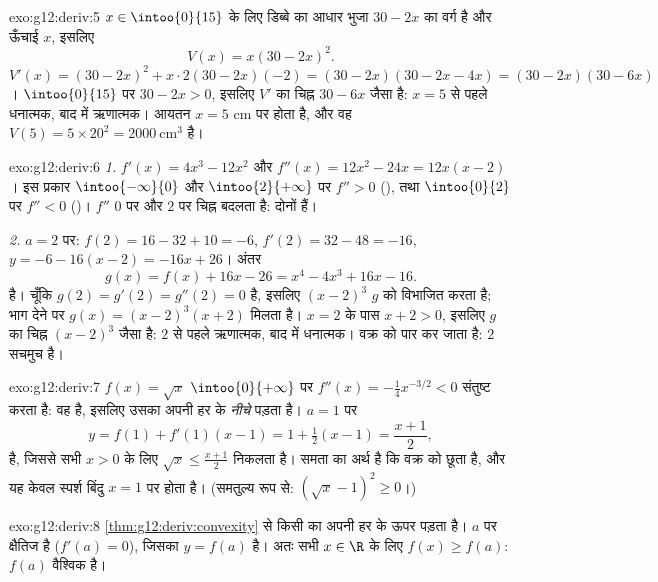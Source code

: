 \begin{solution}{exo:g12:deriv:5}
$x \in \intoo{0}{15}$ के लिए डिब्बे का आधार भुजा $30 - 2x$ का वर्ग है और ऊँचाई $x$, इसलिए
\[
V(x) = x(30 - 2x)^2 .
\]
$V'(x) = (30-2x)^2 + x \cdot 2(30-2x)(-2) = (30-2x)(30 - 2x - 4x)
= (30-2x)(30-6x)$। $\intoo{0}{15}$ पर $30 - 2x > 0$, इसलिए $V'$ का चिह्न $30 - 6x$ जैसा है: $x = 5$ से पहले धनात्मक,
बाद में ऋणात्मक। आयतन $x = 5$ cm पर  होता है, और वह $V(5) = 5 \times 20^2 = 2000\ \text{cm}^3$ है।
\end{solution}

\begin{solution}{exo:g12:deriv:6}
\emph{1.} $f'(x) = 4x^3 - 12x^2$ और $f''(x) = 12x^2 - 24x = 12x(x-2)$। इस प्रकार $\intoo{-\infty}{0}$ और $\intoo{2}{+\infty}$ पर $f'' > 0$ (), तथा $\intoo{0}{2}$ पर
$f'' < 0$ ()। $f''$ $0$ पर और $2$ पर चिह्न बदलता है: दोनों 
हैं।

\emph{2.} $a = 2$ पर: $f(2) = 16 - 32 + 10 = -6$, $f'(2) = 32 - 48 = -16$,  $y = -6 - 16(x-2) = -16x + 26$। अंतर
\[
g(x) = f(x) + 16x - 26 = x^4 - 4x^3 + 16x - 16 .
\]
है। चूँकि $g(2) = g'(2) = g''(2) = 0$ है, इसलिए $(x-2)^3$ $g$ को विभाजित करता है; भाग देने पर $g(x) = (x-2)^3(x+2)$ मिलता
है। $x = 2$ के पास $x + 2 > 0$, इसलिए $g$ का चिह्न $(x-2)^3$ जैसा है: $2$ से पहले ऋणात्मक,
बाद में धनात्मक। वक्र  को पार कर जाता है: $2$ सचमुच
 है।
\end{solution}

\begin{solution}{exo:g12:deriv:7}
 $f(x) = \sqrt{x}$ $\intoo{0}{+\infty}$ पर $f''(x) = -\frac{1}{4}x^{-3/2} < 0$ संतुष्ट करता है: वह  है, इसलिए उसका  अपनी हर
 के \emph{नीचे} पड़ता है। $a = 1$ पर 
\[
y = f(1) + f'(1)(x - 1) = 1 + \tfrac12 (x-1) = \frac{x+1}{2},
\]
है, जिससे सभी $x > 0$ के लिए $\sqrt{x} \leq \frac{x+1}{2}$ निकलता है। समता का अर्थ है कि वक्र 
को छूता है, और यह केवल स्पर्श बिंदु $x = 1$ पर होता है। (समतुल्य रूप से: $\left(\sqrt x - 1\right)^2 \geq 0$।)
\end{solution}

\begin{solution}{exo:g12:deriv:8}
\cref{thm:g12:deriv:convexity} से किसी    का  अपनी हर  के ऊपर पड़ता है।
$a$ पर  क्षैतिज है ($f'(a) = 0$), जिसका  $y = f(a)$ है। अतः सभी $x \in \R$
के लिए $f(x) \geq f(a)$: $f(a)$ वैश्विक  है।
\end{solution}

